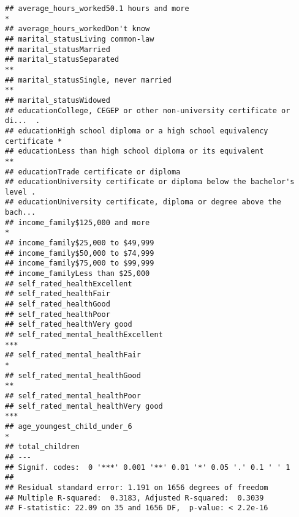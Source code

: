 \documentclass[
]{article}
\begin{document}
\begin{verbatim}
## average_hours_worked50.1 hours and more                               *  
## average_hours_workedDon't know                                           
## marital_statusLiving common-law                                          
## marital_statusMarried                                                    
## marital_statusSeparated                                               ** 
## marital_statusSingle, never married                                   ** 
## marital_statusWidowed                                                    
## educationCollege, CEGEP or other non-university certificate or di...  .  
## educationHigh school diploma or a high school equivalency certificate *  
## educationLess than high school diploma or its equivalent              ** 
## educationTrade certificate or diploma                                    
## educationUniversity certificate or diploma below the bachelor's level .  
## educationUniversity certificate, diploma or degree above the bach...     
## income_family$125,000 and more                                        *  
## income_family$25,000 to $49,999                                          
## income_family$50,000 to $74,999                                          
## income_family$75,000 to $99,999                                          
## income_familyLess than $25,000                                           
## self_rated_healthExcellent                                               
## self_rated_healthFair                                                    
## self_rated_healthGood                                                    
## self_rated_healthPoor                                                    
## self_rated_healthVery good                                               
## self_rated_mental_healthExcellent                                     ***
## self_rated_mental_healthFair                                          *  
## self_rated_mental_healthGood                                          ** 
## self_rated_mental_healthPoor                                             
## self_rated_mental_healthVery good                                     ***
## age_youngest_child_under_6                                            *  
## total_children                                                           
## ---
## Signif. codes:  0 '***' 0.001 '**' 0.01 '*' 0.05 '.' 0.1 ' ' 1
## 
## Residual standard error: 1.191 on 1656 degrees of freedom
## Multiple R-squared:  0.3183, Adjusted R-squared:  0.3039 
## F-statistic: 22.09 on 35 and 1656 DF,  p-value: < 2.2e-16
\end{verbatim}
\end{document}

